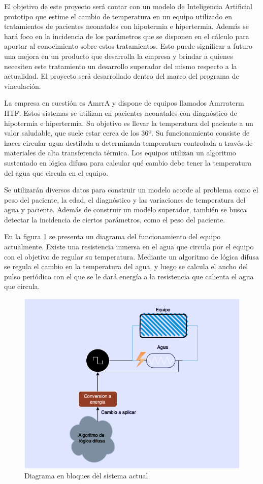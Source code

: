 \documentclass[
11pt, %
]{charter}
\begin{document}
El objetivo de este proyecto será contar con un modelo de Inteligencia Artificial prototipo que estime el cambio de temperatura en un equipo utilizado en tratamientos de pacientes neonatales con hipotermia e hipertermia. Además se hará foco en la incidencia de los parámetros que se disponen en el cálculo para aportar al conocimiento sobre estos tratamientos. Esto puede significar a futuro una mejora en un producto que desarrolla la empresa y brindar a quienes necesiten este tratamiento un desarrollo superador del mismo respecto a la actualidad. El proyecto será desarrollado dentro del marco del programa de vinculación. 

La empresa en cuestión es AmrrA y dispone de equipos llamados Amrraterm HTF. Estos sistemas se utilizan en pacientes neonatales con diagnóstico de hipotermia e hipertermia. Su objetivo es llevar la temperatura del paciente a un valor saludable, que suele estar cerca de los 36º.  Su funcionamiento consiste de hacer circular agua destilada a determinada temperatura controlada a través de materiales de alta transferencia térmica. Los equipos utilizan un algoritmo sustentado en lógica difusa para calcular qué cambio debe tener la temperatura del agua que circula en el equipo. 

Se utilizarán diversos datos para construir un modelo acorde al problema como el peso del paciente, la edad, el diagnóstico y las variaciones de temperatura del agua y paciente. Además de construir un modelo superador, también se busca detectar la incidencia de ciertos parámetros, como el peso del paciente. 

En la figura \ref{fig:diagBloquesActual} se presenta un diagrama del funcionamiento del equipo actualmente. Existe una resistencia inmersa en el agua que circula por el equipo con el objetivo de regular su temperatura. Mediante un algoritmo de lógica difusa se regula el cambio en la temperatura del agua, y luego se calcula el ancho del pulso periódico con el que se le dará energía a la resistencia que calienta el agua que circula.

\begin{figure}[htpb]
	\centering 
	\includegraphics[width=.65\textwidth]{./Figuras/amrra-diagrama1.png}
	\caption{Diagrama en bloques del sistema actual.}
	\label{fig:diagBloquesActual}
\end{figure}
\end{document}
